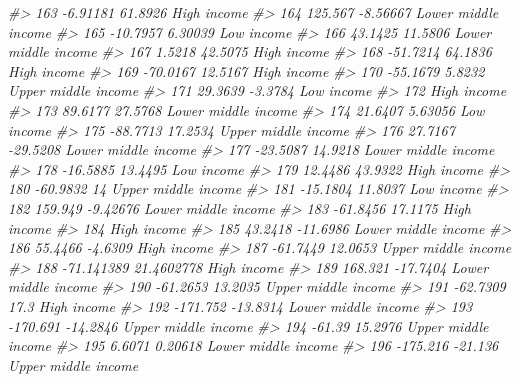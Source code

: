 \documentclass[
  xelatex, ja=standard]{bxjsbook}
\newenvironment{Shaded}{\begin{snugshade}}{\end{snugshade}}
\newcommand{\CommentTok}[1]{\textcolor[rgb]{0.56,0.35,0.01}{\textit{#1}}}
\theoremstyle{definition}
\theoremstyle{definition}
\theoremstyle{definition}
\theoremstyle{definition}
\theoremstyle{remark}
\begin{document}
\begin{Shaded}
\begin{Highlighting}[]
\CommentTok{\#\textgreater{} 163   {-}6.91181    61.8926         High income}
\CommentTok{\#\textgreater{} 164    125.567   {-}8.56667 Lower middle income}
\CommentTok{\#\textgreater{} 165   {-}10.7957    6.30039          Low income}
\CommentTok{\#\textgreater{} 166    43.1425    11.5806 Lower middle income}
\CommentTok{\#\textgreater{} 167     1.5218    42.5075         High income}
\CommentTok{\#\textgreater{} 168   {-}51.7214    64.1836         High income}
\CommentTok{\#\textgreater{} 169   {-}70.0167    12.5167         High income}
\CommentTok{\#\textgreater{} 170   {-}55.1679     5.8232 Upper middle income}
\CommentTok{\#\textgreater{} 171    29.3639    {-}3.3784          Low income}
\CommentTok{\#\textgreater{} 172                               High income}
\CommentTok{\#\textgreater{} 173    89.6177    27.5768 Lower middle income}
\CommentTok{\#\textgreater{} 174    21.6407    5.63056          Low income}
\CommentTok{\#\textgreater{} 175   {-}88.7713    17.2534 Upper middle income}
\CommentTok{\#\textgreater{} 176    27.7167   {-}29.5208 Lower middle income}
\CommentTok{\#\textgreater{} 177   {-}23.5087    14.9218 Lower middle income}
\CommentTok{\#\textgreater{} 178   {-}16.5885    13.4495          Low income}
\CommentTok{\#\textgreater{} 179    12.4486    43.9322         High income}
\CommentTok{\#\textgreater{} 180   {-}60.9832         14 Upper middle income}
\CommentTok{\#\textgreater{} 181   {-}15.1804    11.8037          Low income}
\CommentTok{\#\textgreater{} 182    159.949   {-}9.42676 Lower middle income}
\CommentTok{\#\textgreater{} 183   {-}61.8456    17.1175         High income}
\CommentTok{\#\textgreater{} 184                               High income}
\CommentTok{\#\textgreater{} 185    43.2418   {-}11.6986 Lower middle income}
\CommentTok{\#\textgreater{} 186    55.4466    {-}4.6309         High income}
\CommentTok{\#\textgreater{} 187   {-}61.7449    12.0653 Upper middle income}
\CommentTok{\#\textgreater{} 188 {-}71.141389 21.4602778         High income}
\CommentTok{\#\textgreater{} 189    168.321   {-}17.7404 Lower middle income}
\CommentTok{\#\textgreater{} 190   {-}61.2653    13.2035 Upper middle income}
\CommentTok{\#\textgreater{} 191   {-}62.7309       17.3         High income}
\CommentTok{\#\textgreater{} 192   {-}171.752   {-}13.8314 Lower middle income}
\CommentTok{\#\textgreater{} 193   {-}170.691   {-}14.2846 Upper middle income}
\CommentTok{\#\textgreater{} 194     {-}61.39    15.2976 Upper middle income}
\CommentTok{\#\textgreater{} 195     6.6071    0.20618 Lower middle income}
\CommentTok{\#\textgreater{} 196   {-}175.216    {-}21.136 Upper middle income}

\end{Highlighting}
\end{Shaded}
\end{document}
